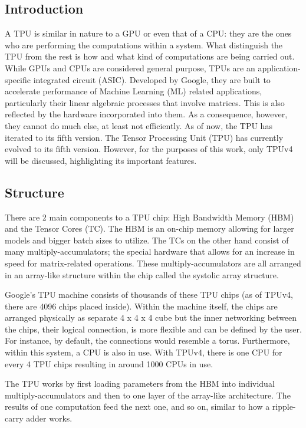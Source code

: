 \subsection{Introduction}
\label{subsec:introduction2}
A TPU is similar in nature to a GPU or even that of a CPU: they are the ones who are performing the computations within a system.
What distinguish the TPU from the rest is how and what kind of computations are being carried out.
While GPUs and CPUs are considered general purpose, TPUs are an application-specific integrated circuit (ASIC).
Developed by Google, they are built to accelerate performance of Machine Learning (ML) related applications, particularly their linear algebraic processes that involve matrices.
This is also reflected by the hardware incorporated into them.
As a consequence, however, they cannot do much else, at least not efficiently.
As of now, the TPU has iterated to its fifth version.
The Tensor Processing Unit (TPU) has currently evolved to its fifth version.
However, for the purposes of this work, only TPUv4 will be discussed, highlighting its important features.

\subsection{Structure}
\label{subsec:structure}
There are 2 main components to a TPU chip: High Bandwidth Memory (HBM) and the Tensor Cores (TC).
The HBM is an on-chip memory allowing for larger models and bigger batch sizes to utilize.
The TCs on the other hand consist of many multiply-accumulators; the special hardware that allows for an increase in speed for matrix-related operations.
These multiply-accumulators are all arranged in an array-like structure within the chip called the systolic array structure.

Google’s TPU machine consists of thousands of these TPU chips (as of TPUv4, there are 4096 chips placed inside).
Within the machine itself, the chips are arranged physically as separate 4 x 4 x 4 cube but the inner networking between the chips, their logical connection, is more flexible and can be defined by the user.
For instance, by default, the connections would resemble a torus.
Furthermore, within this system, a CPU is also in use.
With TPUv4, there is one CPU for every 4 TPU chips resulting in around 1000 CPUs in use.

The TPU works by first loading parameters from the HBM into individual multiply-accumulators and then to one layer of the array-like architecture.
The results of one computation feed the next one, and so on, similar to how a ripple-carry adder works.

